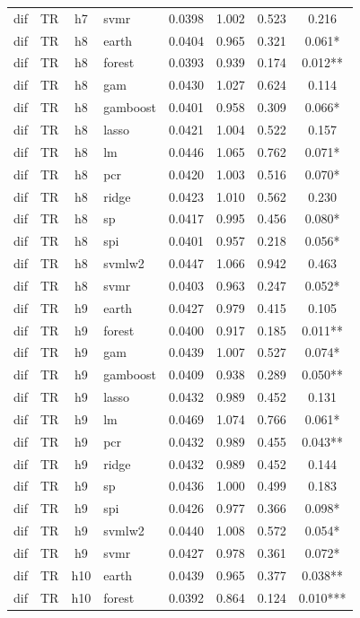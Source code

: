 \begin{ThreePartTable}
\begin{longtable}[t]{llclcccc}
dif & TR & h7 & svmr & 0.0398 & 1.002 & 0.523 & 0.216\\
\addlinespace
dif & TR & h8 & earth & 0.0404 & 0.965 & 0.321 & 0.061*\\
dif & TR & h8 & forest & 0.0393 & 0.939 & 0.174 & 0.012**\\
dif & TR & h8 & gam & 0.0430 & 1.027 & 0.624 & 0.114\\
dif & TR & h8 & gamboost & 0.0401 & 0.958 & 0.309 & 0.066*\\
dif & TR & h8 & lasso & 0.0421 & 1.004 & 0.522 & 0.157\\
dif & TR & h8 & lm & 0.0446 & 1.065 & 0.762 & 0.071*\\
dif & TR & h8 & pcr & 0.0420 & 1.003 & 0.516 & 0.070*\\
dif & TR & h8 & ridge & 0.0423 & 1.010 & 0.562 & 0.230\\
dif & TR & h8 & sp & 0.0417 & 0.995 & 0.456 & 0.080*\\
dif & TR & h8 & spi & 0.0401 & 0.957 & 0.218 & 0.056*\\
dif & TR & h8 & svmlw2 & 0.0447 & 1.066 & 0.942 & 0.463\\
dif & TR & h8 & svmr & 0.0403 & 0.963 & 0.247 & 0.052*\\
\addlinespace
dif & TR & h9 & earth & 0.0427 & 0.979 & 0.415 & 0.105\\
dif & TR & h9 & forest & 0.0400 & 0.917 & 0.185 & 0.011**\\
dif & TR & h9 & gam & 0.0439 & 1.007 & 0.527 & 0.074*\\
dif & TR & h9 & gamboost & 0.0409 & 0.938 & 0.289 & 0.050**\\
dif & TR & h9 & lasso & 0.0432 & 0.989 & 0.452 & 0.131\\
dif & TR & h9 & lm & 0.0469 & 1.074 & 0.766 & 0.061*\\
dif & TR & h9 & pcr & 0.0432 & 0.989 & 0.455 & 0.043**\\
dif & TR & h9 & ridge & 0.0432 & 0.989 & 0.452 & 0.144\\
dif & TR & h9 & sp & 0.0436 & 1.000 & 0.499 & 0.183\\
dif & TR & h9 & spi & 0.0426 & 0.977 & 0.366 & 0.098*\\
dif & TR & h9 & svmlw2 & 0.0440 & 1.008 & 0.572 & 0.054*\\
dif & TR & h9 & svmr & 0.0427 & 0.978 & 0.361 & 0.072*\\
\addlinespace
dif & TR & h10 & earth & 0.0439 & 0.965 & 0.377 & 0.038**\\
dif & TR & h10 & forest & 0.0392 & 0.864 & 0.124 & 0.010***\\

\end{longtable}
\end{ThreePartTable}

